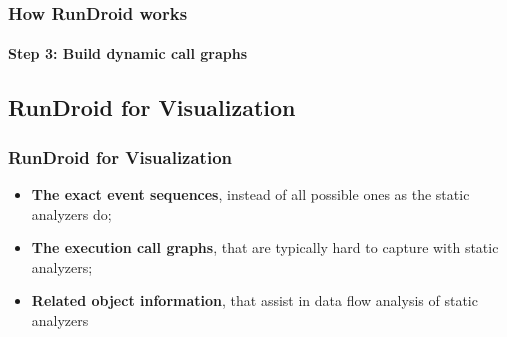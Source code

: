 \documentclass{beamer}
\begin{document}
\begin{frame}
\frametitle{How RunDroid works}
\framesubtitle{Step 3: Build dynamic call graphs}
\end{frame}

\subsection{RunDroid for Visualization}
\begin{frame}
\frametitle{RunDroid for Visualization}
\begin{itemize}
	\item \textbf{The exact event sequences}, instead of all possible ones as the static analyzers do; 
	\item \textbf{The execution call graphs}, that are typically hard to capture with static analyzers; 
	\item \textbf{Related object information}, that assist in data flow analysis of static analyzers
\end{itemize}


\end{frame}
\end{document}
